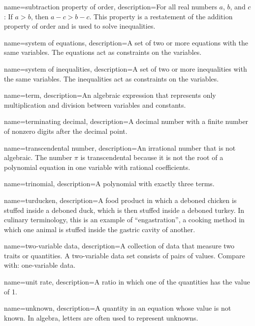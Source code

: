  {
	name=subtraction property of order,
	description={For all real numbers $a$, $b$, and $c$: If $a > b$, then $a - c > b - c$. This property is a restatement of the \gls{addition property of order} and is used to solve inequalities.}
}

 {
	name=system of equations,
	description={A set of two or more equations with the same variables. The equations act as constraints on the variables.}
}

 {
	name=system of inequalities,
	description={A set of two or more inequalities with the same variables. The inequalities act as constraints on the variables.}
}

 {
	name=term,
	description={An algebraic expression that represents only multiplication and division between variables and constants.}
}

 {
	name=terminating decimal,
	description={A decimal number with a finite number of nonzero digits after the decimal point.}
}

 {
	name=transcendental number,
	description={An irrational number that is not algebraic. The number $\pi$ is transcendental because it is not the root of a polynomial equation in one variable with rational coefficients.}
}

 {
	name=trinomial,
	description={A polynomial with exactly three terms.}
}

 {
	name=turducken,
	description={A food product in which a deboned chicken is stuffed inside a deboned duck, which is then stuffed inside a deboned turkey. In culinary terminology, this is an example of ``engastration'', a cooking method in which one animal is stuffed inside the gastric cavity of another.}
}

 {
	name=two-variable data,
	description={A collection of data that measure two traits or quantities. A two-variable data set consists of pairs of values. Compare with: \gls{one-variable data}.}
}

 {
	name=unit rate,
	description={A ratio in which one of the quantities has the value of 1.}
}

 {
	name=unknown,
	description={A quantity in an equation whose value is not known. In algebra, letters are often used to represent unknowns.}
}

